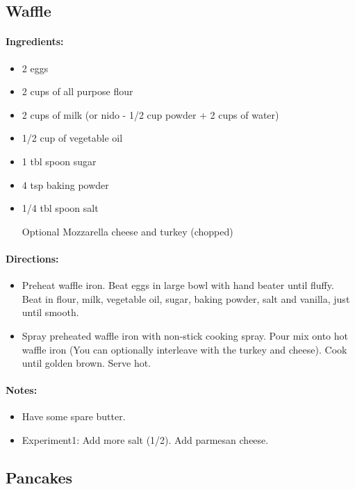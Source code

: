 \documentclass{article}
\begin{document}
\subsection{Waffle}

\paragraph{Ingredients:}
\begin{itemize}
    \item 2 eggs
    \item 2 cups of all purpose flour
    \item 2 cups of milk (or nido - 1/2 cup powder + 2 cups of water)
    \item 1/2 cup of vegetable oil
    \item 1 tbl spoon sugar
    \item 4 tsp baking powder
    \item 1/4 tbl spoon salt
    \item [Optional] Mozzarella cheese and turkey (chopped)
\end{itemize}

\paragraph{Directions:}
\begin{itemize}
    \item Preheat waffle iron. Beat eggs in large bowl with hand beater until fluffy. Beat in flour, milk, vegetable oil, sugar, baking powder, salt and vanilla, just until smooth.
    \item Spray preheated waffle iron with non-stick cooking spray. Pour mix onto hot waffle iron (You can optionally interleave with the turkey and cheese). Cook until golden brown. Serve hot.
\end{itemize}

\paragraph{Notes:}
\begin{itemize}
    \item Have some spare butter.
    \item Experiment1: Add more salt (1/2). Add parmesan cheese.
\end{itemize}

\subsection{Pancakes}
\end{document}
